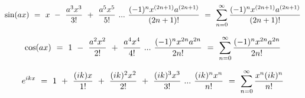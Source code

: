 \documentclass{article}
\begin{document}
\begin{equation} \label{eq:225}
\sin(ax) \hspace{0.125cm} = \hspace{0.125cm} x \hspace{0.125cm} - \hspace{0.125cm} \frac{a^3x^3}{3!} \hspace{0.125cm} + \hspace{0.125cm} \frac{a^5x^5}{5!} \hspace{0.125cm} ... \hspace{0.125cm} \frac{(-1)^{n}x^{(2n+1)}a^{(2n+1)}}{(2n+1)!} \hspace{0.125cm} = \hspace{0.125cm} \sum_{n=0}^{\infty} \frac{(-1)^{n}x^{(2n+1)}a^{(2n+1)}}{(2n+1)!}
\end{equation}

\begin{equation} \label{eq:226}
\cos(ax) \hspace{0.125cm} = \hspace{0.125cm} 1 \hspace{0.125cm} - \hspace{0.125cm} \frac{a^2x^2}{2!} \hspace{0.125cm} + \hspace{0.125cm} \frac{a^4x^4}{4!} \hspace{0.125cm} ... \hspace{0.125cm} \frac{(-1)^{n}x^{2n}a^{2n}}{2n!} \hspace{0.125cm} = \hspace{0.125cm} \sum_{n=0}^{\infty} \frac{(-1)^{n}x^{2n}a^{2n}}{2n!}
\end{equation}

\begin{equation} \label{eq:227}
e^{ikx} \hspace{0.125cm} = \hspace{0.125cm} 1 \hspace{0.125cm} + \hspace{0.125cm} \frac{(ik)x}{1!} \hspace{0.125cm} + \hspace{0.125cm} \frac{(ik)^2x^2}{2!} \hspace{0.125cm} + \hspace{0.125cm} \frac{(ik)^3x^3}{3!} \hspace{0.125cm} ... \hspace{0.125cm} \frac{(ik)^{n}x^{n}}{n!} \hspace{0.125cm} = \hspace{0.125cm} \sum_{n=0}^{\infty} \frac{x^{n}(ik)^{n}}{n!}
\end{equation}
\end{document}
